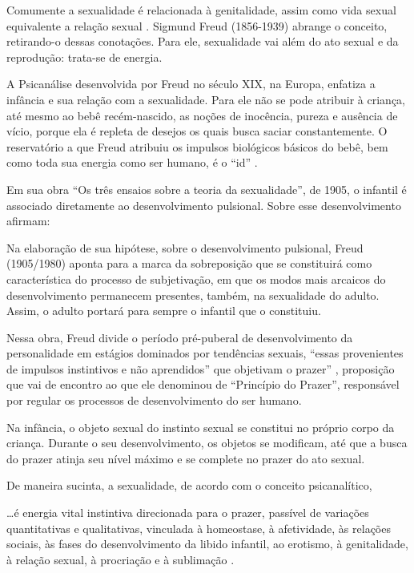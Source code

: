 Comumente a sexualidade é relacionada à genitalidade, assim como vida sexual equivalente a relação sexual \cite{BEARZOTI1994}. Sigmund Freud (1856-1939) abrange o conceito, retirando-o dessas conotações. Para ele, sexualidade vai além do ato sexual e da reprodução: trata-se de energia.

A Psicanálise desenvolvida por Freud no século XIX, na Europa, enfatiza a infância e sua relação com a sexualidade. Para ele não se pode atribuir à criança, até mesmo ao bebê recém-nascido, as noções de inocência, pureza e ausência de vício, porque ela é repleta de desejos os quais busca saciar constantemente. O reservatório a que Freud atribuiu os impulsos biológicos básicos do bebê, bem como toda sua energia como ser humano, é o ``id'' \cite{GALLATIN1978}. 

Em sua obra ``Os três ensaios sobre a teoria da sexualidade'', de 1905, o infantil é associado diretamente ao desenvolvimento pulsional. Sobre esse desenvolvimento  afirmam: 

 \begin{citacao}
	Na elaboração de sua hipótese, sobre o desenvolvimento pulsional, Freud (1905/1980) aponta para a marca da sobreposição que se constituirá como característica do processo de subjetivação, em que os modos mais arcaicos do desenvolvimento permanecem presentes, também, na sexualidade do adulto. Assim, o adulto portará para sempre o infantil que o constituiu.
\end{citacao}

Nessa obra, Freud divide o período pré-puberal de desenvolvimento da personalidade em estágios dominados por tendências sexuais, ``essas provenientes de impulsos instintivos e não aprendidos'' que objetivam o prazer'' \cite[p. 2]{SCHINDHELM2011}, proposição que vai de encontro ao que ele denominou de ``Princípio do Prazer'', responsável por regular os processos de desenvolvimento do ser humano.

Na infância, o objeto sexual do instinto sexual se constitui no próprio corpo da criança. Durante o seu desenvolvimento, os objetos se modificam, até que a busca do prazer atinja seu nível máximo e se complete no prazer do ato sexual.

De maneira sucinta, a sexualidade, de acordo com o conceito psicanalítico, 

\begin{citacao}
	\ldots é energia vital instintiva direcionada para o prazer, passível de variações quantitativas e qualitativas, vinculada à homeostase, à afetividade, às relações sociais, às fases do desenvolvimento da libido infantil, ao erotismo, à genitalidade, à relação sexual, à procriação e à sublimação \cite[p. 117]{BEARZOTI1994}.
\end{citacao}

